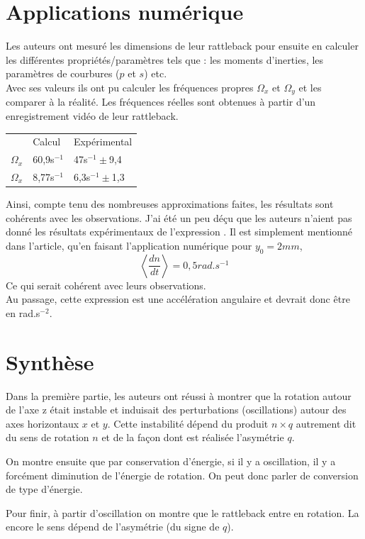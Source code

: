 \documentclass[12pt,a4paper]{article}
\makeatletter
\renewcommand*{\eqref}[1]{%
	\hyperref[{#1}]{\textup{\tagform@{\ref*{#1}}}}%
}
\makeatother
\begin{document}
	\section{Applications numérique}
	Les auteurs ont mesuré les dimensions de leur rattleback pour ensuite en calculer les différentes propriétés/paramètres tels que : les moments d'inerties, les paramètres de courbures ($p$ et $s$) etc.\\
	Avec ses valeurs ils ont pu calculer les fréquences propres $\Omega_x$ et $\Omega_y$ et les comparer à la réalité. Les fréquences réelles sont obtenues à partir d'un enregistrement vidéo de leur rattleback.

	\begin{center}
		\begin{tabular}{lll}
		&	Calcul	&Expérimental\\[4pt]
		$\Omega_x$		&	60,9s$^{-1}$	&47s$^{-1}\pm$9,4\\
		$\Omega_x$		&	8,77s$^{-1}$	&6,3s$^{-1}\pm$1,3
		\end{tabular}
	\end{center}
	Ainsi, compte tenu des nombreuses approximations faites, les résultats sont cohérents avec les observations.
	J'ai été un peu déçu que les auteurs n'aient pas donné les résultats expérimentaux de l'expression \eqref{eq:moyenne-rot}. Il est simplement mentionné dans l'article, qu'en faisant l'application numérique pour $y_0=2mm$,
	$$\left<\dfrac{dn}{dt}\right>=0,5rad.s^{-1}$$
	Ce qui serait cohérent avec leurs observations.\\
	Au passage, cette expression est une accélération angulaire et devrait donc être en rad.s$^{-2}$.
	\section{Synthèse}
	
	Dans la première partie, les auteurs ont réussi à montrer que la rotation autour de l'axe z était instable et induisait des perturbations (oscillations) autour des axes horizontaux $x$ et $y$. Cette instabilité dépend du produit $n\times q$ autrement dit du sens de rotation $n$ et de la façon dont est réalisée l'asymétrie $q$.
	
	On montre ensuite que par conservation d'énergie, si il y a oscillation, il y a forcément diminution de l'énergie de rotation. On peut donc parler de conversion de type d'énergie.
	
	Pour finir, à partir d'oscillation on montre que le rattleback entre en rotation. La encore le sens dépend de l'asymétrie (du signe de $q$).
	
\end{document}
